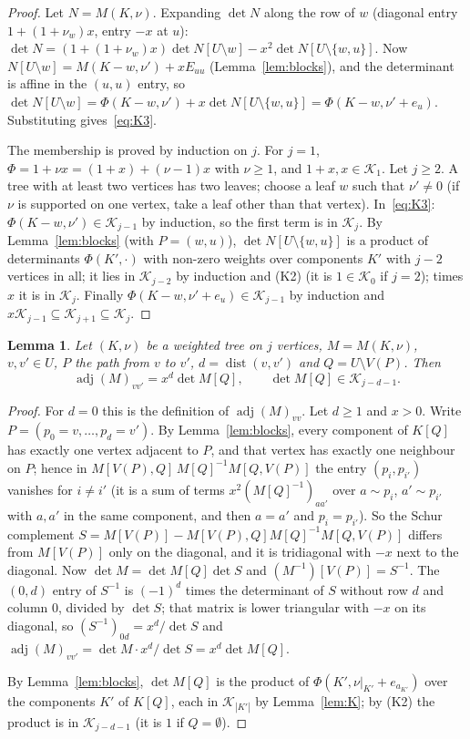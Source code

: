 \documentclass[11pt]{amsart}
\newtheorem{lemma}[theorem]{Lemma}
\theoremstyle{definition}
\theoremstyle{remark}
\newcommand{\adj}{\operatorname{adj}}
\newcommand{\K}{\mathcal K}
\begin{document}
\begin{proof}
Let $N=M(K,\nu)$. Expanding $\det N$ along the row of $w$ (diagonal entry
$1+(1+\nu_w)x$, entry $-x$ at $u$):
$\det N=(1+(1+\nu_w)x)\det N[U\setminus w]-x^2\det N[U\setminus\{w,u\}]$.
Now $N[U\setminus w]=M(K-w,\nu')+xE_{uu}$ (Lemma~\ref{lem:blocks}), and the
determinant is affine in the $(u,u)$ entry, so
$\det N[U\setminus w]=\Phi(K-w,\nu')+x\det N[U\setminus\{w,u\}]=\Phi(K-w,\nu'+e_u)$.
Substituting gives~\eqref{eq:K3}.

The membership is proved by induction on $j$. For $j=1$,
$\Phi=1+\nu x=(1+x)+(\nu-1)x$ with $\nu\ge1$, and $1+x,x\in\K_1$. Let $j\ge2$.
A tree with at least two vertices has two leaves; choose a leaf $w$ such that
$\nu'\ne0$ (if $\nu$ is supported on one vertex, take a leaf other than that
vertex). In~\eqref{eq:K3}: $\Phi(K-w,\nu')\in\K_{j-1}$ by induction, so the
first term is in $\K_j$. By Lemma~\ref{lem:blocks} (with $P=(w,u)$),
$\det N[U\setminus\{w,u\}]$ is a product of determinants $\Phi(K',\cdot)$ with
non-zero weights over components $K'$ with $j-2$ vertices in all; it lies in
$\K_{j-2}$ by induction and (K2) (it is $1\in\K_0$ if $j=2$); times $x$ it is in
$\K_j$. Finally $\Phi(K-w,\nu'+e_u)\in\K_{j-1}$ by induction and
$x\K_{j-1}\subseteq\K_{j+1}\subseteq\K_j$.
\end{proof}

\begin{lemma}\label{lem:path}
Let $(K,\nu)$ be a weighted tree on $j$ vertices, $M=M(K,\nu)$, $v,v'\in U$,
$P$ the path from $v$ to $v'$, $d=\operatorname{dist}(v,v')$ and
$Q=U\setminus V(P)$. Then
\[
\adj(M)_{vv'}=x^d\det M[Q],\qquad \det M[Q]\in\K_{j-d-1}.
\]
\end{lemma}

\begin{proof}
For $d=0$ this is the definition of $\adj(M)_{vv}$. Let $d\ge1$ and $x>0$.
Write $P=(p_0=v,\dots,p_d=v')$. By Lemma~\ref{lem:blocks}, every component of
$K[Q]$ has exactly one vertex adjacent to $P$, and that vertex has exactly one
neighbour on $P$; hence in $M[V(P),Q]\,M[Q]^{-1}M[Q,V(P)]$ the entry
$(p_i,p_{i'})$ vanishes for $i\ne i'$ (it is a sum of terms
$x^2(M[Q]^{-1})_{aa'}$ over $a\sim p_i$, $a'\sim p_{i'}$ with $a,a'$ in the same
component, and then $a=a'$ and $p_i=p_{i'}$). So the Schur complement
$S=M[V(P)]-M[V(P),Q]M[Q]^{-1}M[Q,V(P)]$ differs from $M[V(P)]$ only on the
diagonal, and it is tridiagonal with $-x$ next to the diagonal. Now
$\det M=\det M[Q]\det S$ and $(M^{-1})[V(P)]=S^{-1}$. The $(0,d)$ entry of
$S^{-1}$ is $(-1)^d$ times the determinant of $S$ without row $d$ and
column $0$, divided by $\det S$; that matrix is lower triangular with $-x$ on
its diagonal, so $(S^{-1})_{0d}=x^d/\det S$ and
$\adj(M)_{vv'}=\det M\cdot x^d/\det S=x^d\det M[Q]$.

By Lemma~\ref{lem:blocks}, $\det M[Q]$ is the product of $\Phi(K',\nu|_{K'}+e_{a_{K'}})$
over the components $K'$ of $K[Q]$, each in $\K_{|K'|}$ by Lemma~\ref{lem:K};
by (K2) the product is in $\K_{j-d-1}$ (it is $1$ if $Q=\emptyset$).
\end{proof}
\end{document}
